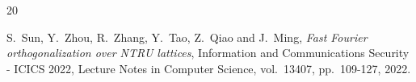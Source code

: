 \documentclass{llncs}
\begin{document}
\begin{thebibliography}{20}






S.~Sun, Y.~Zhou, R.~Zhang, Y.~Tao, Z.~Qiao and J.~Ming,
\emph{Fast Fourier orthogonalization over NTRU lattices},
Information and Communications Security - ICICS 2022,
Lecture Notes in Computer Science, vol.~13407, pp.~109-127, 2022.








\end{thebibliography}

\end{document}
